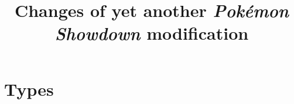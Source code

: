 \documentclass{article}
\title{Changes of yet another \emph{Pok\'emon Showdown} modification}
\begin{document}
\maketitle
\tableofcontents


\clearpage
\section{Types}

\end{document}

